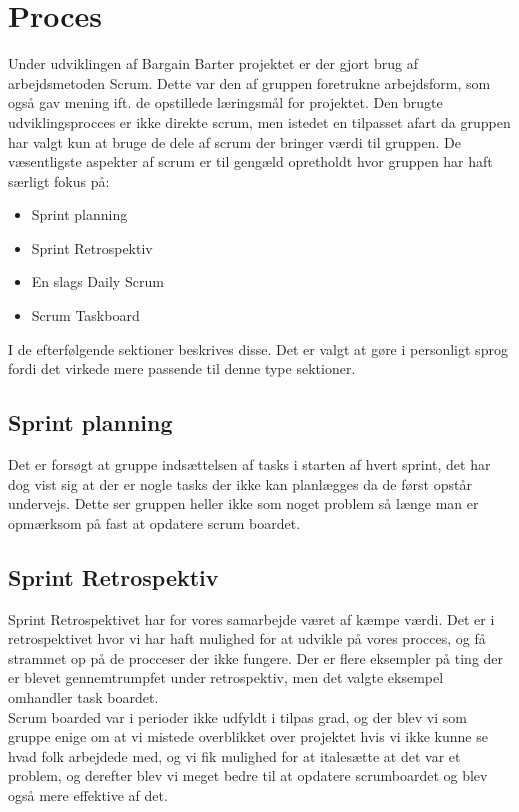 \chapter{Proces}

Under udviklingen af Bargain Barter projektet er der gjort brug af arbejdsmetoden Scrum. Dette var den af gruppen foretrukne arbejdsform, som også gav mening ift. de opstillede læringsmål for projektet. Den brugte udviklingsprocces er ikke direkte scrum, men istedet en tilpasset afart da gruppen har valgt kun at bruge de dele af scrum der bringer værdi til gruppen. De væsentligste aspekter af scrum er til gengæld opretholdt hvor gruppen har haft særligt fokus på:

\begin{itemize}
		\item Sprint planning
		\item Sprint Retrospektiv
		\item En slags Daily Scrum
		\item Scrum Taskboard
	\end{itemize}

I de efterfølgende sektioner beskrives disse. Det er valgt at gøre i personligt sprog fordi det virkede mere passende til denne type sektioner. 

\section{Sprint planning}
Det er forsøgt at gruppe indsættelsen af tasks i starten af hvert sprint, det har dog vist sig at der er nogle tasks der ikke kan planlægges da de først opstår undervejs. Dette ser gruppen heller ikke som noget problem så længe man er opmærksom på fast at opdatere scrum boardet.  


\section{Sprint Retrospektiv}
Sprint Retrospektivet har for vores samarbejde været af kæmpe værdi. Det er i retrospektivet hvor vi har haft mulighed for at udvikle på vores procces, og få strammet op på de procceser der ikke fungere. Der er flere eksempler på ting der er blevet gennemtrumpfet under retrospektiv, men det valgte eksempel omhandler task boardet. \\

Scrum boarded var i perioder ikke udfyldt i tilpas grad, og der blev vi som gruppe enige om at vi mistede overblikket over projektet hvis vi ikke kunne se hvad folk arbejdede med, og vi fik mulighed for at italesætte at det var et problem, og derefter blev vi meget bedre til at opdatere scrumboardet og blev også mere effektive af det.

